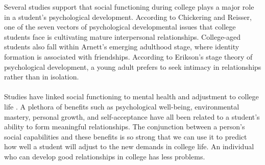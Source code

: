 \documentclass[journal]{./IEEE/IEEEtran}
\begin{document}
Several studies support that social functioning during college plays a major role in a student's psychological development. According to Chickering and Reisser, one of the seven vectors of psychological developmental issues that college students face is cultivating mature interpersonal relationships\cite{chickering}. College-aged students also fall within Arnett's emerging adulthood stage, where identity formation is associated with friendships\cite{erb}. According to Erikson's stage theory of psychological development, a young adult prefers to seek intimacy in relationships rather than in isolation\cite{erikson}.
\\
\\
\indent Studies have linked social functioning to mental health and adjustment to college life \cite{erb}. A plethora of benefits such as psychological well-being, environmental mastery, personal growth, and self-acceptance have all been related to a student's ability to form meaningful relationships\cite{erb}. The conjunction between a person’s social capabilities and these benefits is so strong that we can use it to predict how well a student  will adjust to the new demands in college life. An individual who can develop good relationships in college has less problems.
\end{document}
